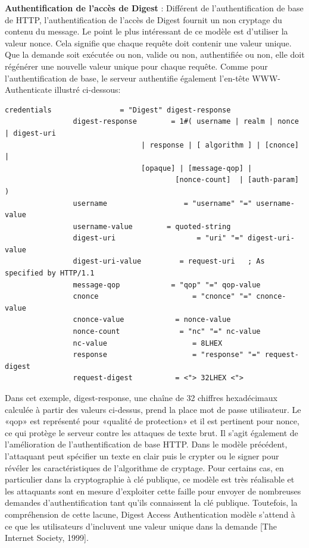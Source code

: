 \textbf{Authentification de l'accès de Digest} : Différent de l'authentification de base de HTTP, l'authentification de l'accès de Digest fournit un non cryptage du contenu du message. Le point le plus intéressant de ce modèle est d'utiliser la valeur nonce. Cela signifie que chaque requête doit contenir une valeur unique. Que la demande soit exécutée ou non, valide ou non, authentifiée ou non, elle doit régénérer une nouvelle valeur unique pour chaque requête. Comme pour l'authentification de base, le serveur authentifie également l'en-tête WWW-Authenticate illustré ci-dessous:
\begin{verbatim}
credentials                = "Digest" digest-response
                digest-response        = 1#( username | realm | nonce | digest-uri
                       			| response | [ algorithm ] | [cnonce] |
                       			[opaque] | [message-qop] |
                           				[nonce-count]  | [auth-param] )
                username                  = "username" "=" username-value
                username-value        = quoted-string
                digest-uri                   = "uri" "=" digest-uri-value
                digest-uri-value         = request-uri   ; As specified by HTTP/1.1
                message-qop            = "qop" "=" qop-value
                cnonce                      = "cnonce" "=" cnonce-value
                cnonce-value            = nonce-value
                nonce-count              = "nc" "=" nc-value
                nc-value                    = 8LHEX
                response 	                = "response" "=" request-digest
                request-digest          = <"> 32LHEX <">
\end{verbatim}
Dans cet exemple, digest-response, une chaîne de 32 chiffres hexadécimaux calculée à partir des valeurs ci-dessus, prend la place mot de passe utilisateur. Le «qop» est représenté pour «qualité de protection» et il est pertinent pour nonce, ce qui protège le serveur contre les attaques de texte brut. Il s'agit également de l'amélioration de l'authentification de base HTTP. Dans le modèle précédent, l'attaquant peut spécifier un texte en clair puis le crypter ou le signer pour révéler les caractéristiques de l'algorithme de cryptage. Pour certains cas, en particulier dans la cryptographie à clé publique, ce modèle est très réalisable et les attaquants sont en mesure d'exploiter cette faille pour envoyer de nombreuses demandes d'authentification tant qu'ils connaissent la clé publique. Toutefois, la compréhension de cette lacune, Digest Access Authentication modèle s'attend à ce que les utilisateurs d'incluvent une valeur unique dans la demande [The Internet Society, 1999].

